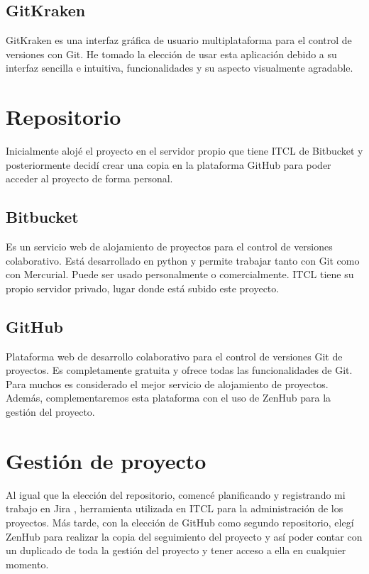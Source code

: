 \subsection{GitKraken}

GitKraken es una interfaz gráfica de usuario multiplataforma para el control de versiones con Git. He tomado la elección de usar esta aplicación debido a su interfaz sencilla e intuitiva, funcionalidades y su aspecto visualmente agradable.

\section{Repositorio}

Inicialmente alojé el proyecto en el servidor propio que tiene ITCL de Bitbucket \cite{git:bitbucket} y posteriormente decidí crear una copia en la plataforma GitHub para poder acceder al proyecto de forma personal.

\subsection{Bitbucket}

Es un servicio web de alojamiento de proyectos para el control de versiones colaborativo. Está desarrollado en python y permite trabajar tanto con Git como con Mercurial. Puede ser usado personalmente o comercialmente. ITCL tiene su propio servidor privado, lugar donde está subido este proyecto.

\subsection{GitHub}

Plataforma web de desarrollo colaborativo para el control de versiones Git de proyectos. Es completamente gratuita y ofrece todas las funcionalidades de Git. Para muchos es considerado el mejor servicio de alojamiento de proyectos. Además, complementaremos esta plataforma con el uso de ZenHub para la gestión del proyecto. 

\section{Gestión de proyecto}

Al igual que la elección del repositorio, comencé planificando y registrando mi trabajo en Jira \cite{git:jira}, herramienta utilizada en ITCL para la administración de los proyectos. Más tarde, con la elección de GitHub como segundo repositorio, elegí ZenHub para realizar la copia del seguimiento del proyecto y así poder contar con un duplicado de toda la gestión del proyecto y tener acceso a ella en cualquier momento.

